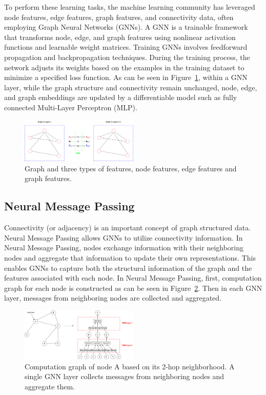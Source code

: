 To perform these learning tasks, the machine learning community has leveraged node features, edge features, graph features, and connectivity data, often employing Graph Neural Networks (GNNs).
A GNN is a trainable framework that transforms node, edge, and graph features using nonlinear activation functions and learnable weight matrices.
Training GNNs involves feedforward propagation and backpropagation techniques.
During the training process, the network adjusts its weights based on the examples in the training dataset to minimize a specified loss function.
As can be seen in Figure~\ref{fig:gnn}, within a GNN layer, while the graph structure and connectivity remain unchanged, node, edge, and graph embeddings are updated by a differentiable model such as fully connected Multi-Layer Perceptron (MLP).


\begin{figure}[htb!]
    \centering
    \includegraphics[width=0.5\textwidth]{figures/GNN}
    \caption{Graph and three types of features, node features, edge features and graph features.}
    \label{fig:gnn}
\end{figure}


\subsection{Neural Message Passing}\label{subsec:neural-message-passing}
Connectivity (or adjacency) is an important concept of graph structured data.
Neural Message Passing allows GNNs to utilize connectivity information.
In Neural Message Passing, nodes exchange information with their neighboring nodes and aggregate that information to update their own representations.
This enables GNNs to capture both the structural information of the graph and the features associated with each node.
In Neural Message Passing, first, computation graph for each node is constructed as can be seen in Figure~\ref{fig:message-passing}.
Then in each GNN layer, messages from neighboring nodes are collected and aggregated.


\begin{figure}[htb!]
    \centering
    \includegraphics[width=0.5\textwidth]{figures/Message Passing.drawio}
    \caption{Computation graph of node A based on its 2-hop neighborhood.
    A single GNN layer collects messages from neighboring nodes and aggregate them.}
    \label{fig:message-passing}
\end{figure}


